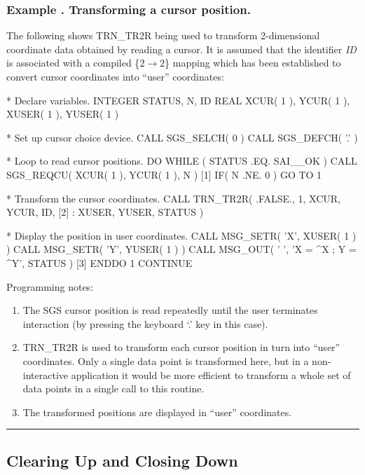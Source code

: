 \documentclass[twoside,nolof,11pt]{starlink}
\providecommand{\name}[1]{\small{#1}}
\providecommand{\fortvar}[1]{\emph{#1}}
\newcounter{examplecounter}
\providecommand{\example}[1]{\addtocounter{examplecounter}{1}
                         \subsubsection*{Example \theexamplecounter. #1}}
\providecommand{\exampledone}[0]{\begin{center} \rule{6em}{0.2mm} \end{center}}
\begin{document}
\example{Transforming a cursor position.}
The following shows \name{TRN\_TR2R} being used to transform 2-dimensional
coordinate data obtained by reading a cursor.
It is assumed that the identifier \fortvar{ID} is associated with a compiled
\mbox{\{$2 \rightarrow 2$\}} mapping which has been established to convert
cursor coordinates into ``user'' coordinates:

\begin{terminalv}
*  Declare variables.
      INTEGER STATUS, N, ID
      REAL XCUR( 1 ), YCUR( 1 ), XUSER( 1 ), YUSER( 1 )

*  Set up cursor choice device.
      CALL SGS_SELCH( 0 )
      CALL SGS_DEFCH( '.' )

*  Loop to read cursor positions.
      DO WHILE ( STATUS .EQ. SAI__OK )
         CALL SGS_REQCU( XCUR( 1 ), YCUR( 1 ), N )      [1]
         IF( N .NE. 0 ) GO TO 1

*  Transform the cursor coordinates.
         CALL TRN_TR2R( .FALSE., 1, XCUR, YCUR, ID,     [2]
     :                  XUSER, YUSER, STATUS )

*  Display the position in user coordinates.
         CALL MSG_SETR( 'X', XUSER( 1 ) )
         CALL MSG_SETR( 'Y', YUSER( 1 ) )
         CALL MSG_OUT( ' ', 'X = ^X ; Y = ^Y', STATUS ) [3]
      ENDDO
    1 CONTINUE
\end{terminalv}

Programming notes:

\begin{enumerate}

\item The \name{SGS} cursor position is read repeatedly until the user
terminates interaction (by pressing the keyboard `.' key in this case).

\item \name{TRN\_TR2R} is used to transform each cursor position in turn
into ``user'' coordinates.
Only a single data point is transformed here, but in a non-interactive
application it would be more efficient to transform a whole set of data
points in a single call to this routine.

\item The transformed positions are displayed in ``user'' coordinates.

\end{enumerate}
\exampledone


\subsection{Clearing Up and Closing Down}
\end{document}
